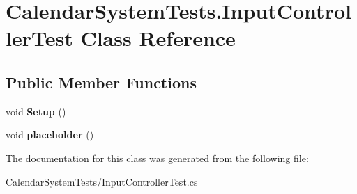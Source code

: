 \hypertarget{class_calendar_system_tests_1_1_input_controller_test}{\section{Calendar\+System\+Tests.\+Input\+Controller\+Test Class Reference}
\label{class_calendar_system_tests_1_1_input_controller_test}
}
\subsection*{Public Member Functions}
\begin{DoxyCompactItemize}
\item 
\hypertarget{class_calendar_system_tests_1_1_input_controller_test_a849034a489625adfa5552f586ab091a3}{void {\bfseries Setup} ()}\label{class_calendar_system_tests_1_1_input_controller_test_a849034a489625adfa5552f586ab091a3}

\item 
\hypertarget{class_calendar_system_tests_1_1_input_controller_test_ae07b7bd2317b14ca8430ed332247dff2}{void {\bfseries placeholder} ()}\label{class_calendar_system_tests_1_1_input_controller_test_ae07b7bd2317b14ca8430ed332247dff2}

\end{DoxyCompactItemize}


The documentation for this class was generated from the following file\+:\begin{DoxyCompactItemize}
\item 
Calendar\+System\+Tests/Input\+Controller\+Test.\+cs\end{DoxyCompactItemize}
